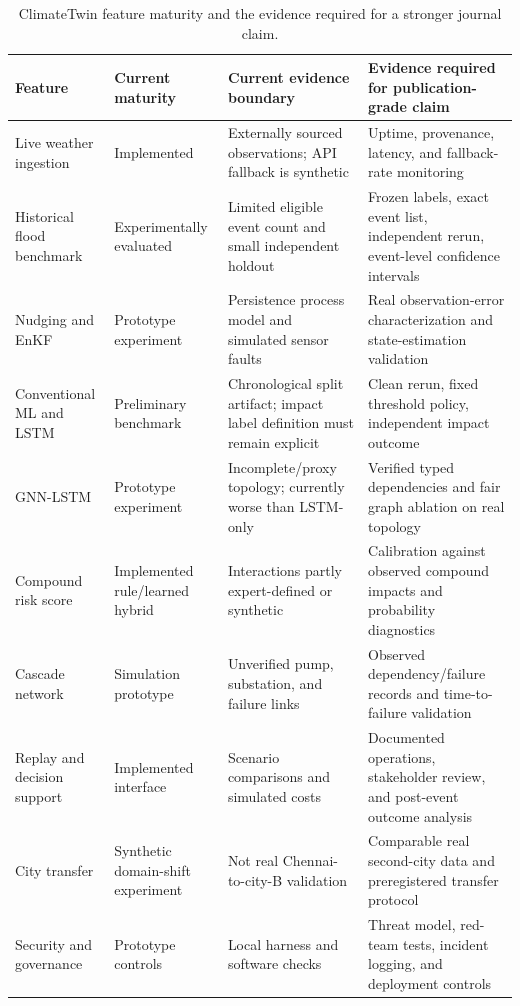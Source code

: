 \documentclass[journal]{IEEEtran}
\begin{document}
\begin{table}[t]
\caption{ClimateTwin feature maturity and the evidence required for a stronger journal claim.}
\label{tab:maturity}
\centering\footnotesize
\begin{tabular}{p{}p{}p{}p{}}
\toprule
Feature & Current maturity & Current evidence boundary & Evidence required for publication-grade claim \\
\midrule
Live weather ingestion & Implemented & Externally sourced observations; API fallback is synthetic & Uptime, provenance, latency, and fallback-rate monitoring \\
Historical flood benchmark & Experimentally evaluated & Limited eligible event count and small independent holdout & Frozen labels, exact event list, independent rerun, event-level confidence intervals \\
Nudging and EnKF & Prototype experiment & Persistence process model and simulated sensor faults & Real observation-error characterization and state-estimation validation \\
Conventional ML and LSTM & Preliminary benchmark & Chronological split artifact; impact label definition must remain explicit & Clean rerun, fixed threshold policy, independent impact outcome \\
GNN-LSTM & Prototype experiment & Incomplete/proxy topology; currently worse than LSTM-only & Verified typed dependencies and fair graph ablation on real topology \\
Compound risk score & Implemented rule/learned hybrid & Interactions partly expert-defined or synthetic & Calibration against observed compound impacts and probability diagnostics \\
Cascade network & Simulation prototype & Unverified pump, substation, and failure links & Observed dependency/failure records and time-to-failure validation \\
Replay and decision support & Implemented interface & Scenario comparisons and simulated costs & Documented operations, stakeholder review, and post-event outcome analysis \\
City transfer & Synthetic domain-shift experiment & Not real Chennai-to-city-B validation & Comparable real second-city data and preregistered transfer protocol \\
Security and governance & Prototype controls & Local harness and software checks & Threat model, red-team tests, incident logging, and deployment controls \\
\bottomrule
\end{tabular}
\end{table}
\end{document}
